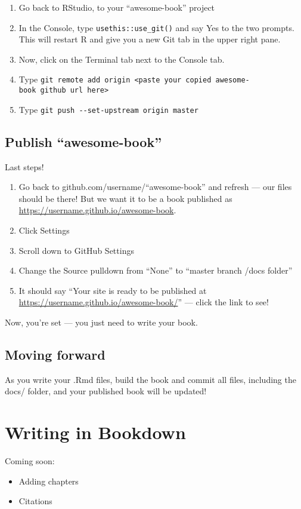 \documentclass[
]{book}
\providecommand{\tightlist}{%
  \setlength{\itemsep}{0pt}\setlength{\parskip}{0pt}}
\begin{document}
\begin{enumerate}
\def\labelenumi{\arabic{enumi}.}
\tightlist
\item
  Go back to RStudio, to your ``awesome-book'' project
\item
  In the Console, type \texttt{usethis::use\_git()} and say Yes to the two prompts. This will restart R and give you a new Git tab in the upper right pane.
\item
  Now, click on the Terminal tab next to the Console tab.
\item
  Type \texttt{git\ remote\ add\ origin\ \textless{}paste\ your\ copied\ awesome-book\ github\ url\ here\textgreater{}}
\item
  Type \texttt{git\ push\ -\/-set-upstream\ origin\ master}
\end{enumerate}

\hypertarget{publish-awesome-book}{%
\section{Publish ``awesome-book''}\label{publish-awesome-book}}

Last steps!

\begin{enumerate}
\def\labelenumi{\arabic{enumi}.}
\tightlist
\item
  Go back to github.com/username/``awesome-book'' and refresh --- our files should be there! But we want it to be a book published as \url{https://username.github.io/awesome-book}.
\item
  Click Settings
\item
  Scroll down to GitHub Settings
\item
  Change the Source pulldown from ``None'' to ``master branch /docs folder''
\item
  It should say ``Your site is ready to be published at \url{https://username.github.io/awesome-book/}'' --- click the link to see!
\end{enumerate}

Now, you're set --- you just need to write your book.

\hypertarget{moving-forward}{%
\section{Moving forward}\label{moving-forward}}

As you write your .Rmd files, build the book and commit all files, including the docs/ folder, and your published book will be updated!

\hypertarget{write}{%
\chapter{Writing in Bookdown}\label{write}}

Coming soon:

\begin{itemize}
\tightlist
\item
  Adding chapters
\item
  Citations
\end{itemize}

  

\backmatter
\printindex
\end{document}
